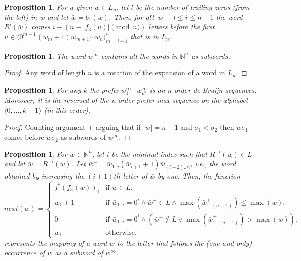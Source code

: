 \documentclass{article}
\newtheorem{proposition}[theorem]{Proposition}
\theoremstyle{definition}
\newcommand{\N}{{\mathbb{N}}}
\newcommand{\T}[1]{\langle{#1}\rangle}
\newcommand{\rr}[2]{R^{#2}({#1})}
\newcommand{\rl}[2]{R^{-{#2}}({#1})}
\begin{document}
\begin{proposition}\label{advanced-pos}
	For a given $w \in L_n$, let $l$ be the number of trailing zeros (from the left) in $w$ and let $\bar{w}=b_1(w)$. Then, for all $|w|-l \leq i \leq n-1$ the word $\rr{\bar{w}}{i}$ comes $i-(n-|f_3(u)| \pmod n)$ letters before the first $u \in \T{0^{m-1} (\bar{w}_{m} + 1) \bar{w}_{m+1}\cdots \bar{w}_n}_{m=i+1}^{n}$ that is in $L_n$. 
\end{proposition}


\begin{proposition}
	The word $w^\infty$ contains all the words in $\N^n$ as subwords.
\end{proposition}
\begin{proof}
	Any word of length $n$ is a rotation of the expansion of a word in $L_n$.
\end{proof}


\begin{proposition}
	For any $k$ the prefix $w^\infty_1 \cdots w^\infty_{k^n}$ is an $n$-order de Bruijn sequences. Moreover, it is the reversed of the n-order prefer-max sequence on the alphabet $\T{0,\dots,k-1}$ (in this order). 
\end{proposition}
\begin{proof}
	Counting argument + arguing that if $|w| =n-1$ and $\sigma_1 < \sigma_2$ then $w\sigma_1$ comes before $w\sigma_2$ as subwords of $w^\infty$.
\end{proof}


\begin{proposition}
For $w \in \N^n$, let $i$ be the minimal index such that $\rl{w}{i} \in L$ and let $\bar{w}=\rl{w}{i}$. Let $\bar{w}^+=\bar{w}_{1..i}(\bar{w}_{i+1}+1)\bar{w}_{(i+2)..n}$, i.e., the word obtained by increasing the $(i+1)th$ letter of $\bar{w}$ by one.  Then, the function
$$next(w)=
\begin{cases}
f^*(f_3(w))_1 & \text{if } w \in L; \\
w_1+1         & \text{if }\bar{w}_{1..i}= 0^i \wedge \bar{w}^+ \in L\wedge \max{(\bar{w}^+_{1..(n-1)})} \leq \max(w); \\
0             & \text{if }\bar{w}_{1..i}= 0^i \wedge (\bar{w}^+ \notin L \vee \max{(\bar{w}^+_{1..(n-1)})} > \max(w)); \\
w_1           & \text{otherwise.}
\end{cases}$$
represents the mapping of a word $w$ to the letter that follows the (one and only) occurrence of $w$ as a subword of $w^\infty$.
\end{proposition}
\end{document}
